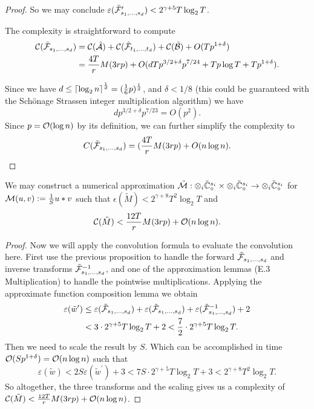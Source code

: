 \begin{proof}
    So we may conclude $\varepsilon(\tilde{\mathcal F}_{s_1, \ldots, s_d}^\prime) < 2^{\gamma + 5}T\log_2 T$.

    The complexity is straightforward to compute
    \begin{align*}
        \mathcal C(\tilde{\mathcal F}_{s_1, \ldots, s_d}) &= \mathcal C(\tilde{\mathcal A}) + \mathcal C(\tilde{\mathcal F}_{t_1, \ldots, t_d}) + \mathcal C(\tilde{\mathcal B}) + O(Tp^{1 + \delta})\\
                                                &= \frac{4T}{r}M(3rp) + O(dTp^{3/2 + \delta}p^{7/24} + Tp\log T + Tp^{1 + \delta}).
    \end{align*}

    Since we have $d  \le \left \lceil \log_2 n \right \rceil^{\frac{1}{d}} = (\frac{1}{6} p)^{\frac{1}{d}}$, and $\delta < 1/8$ (this could be guaranteed with the Sch\"{o}nage Strassen integer multiplication algorithm) we have
    \[
        dp^{3/2 + \delta}p^{7/23} = O(p^2).
    \]
    Since $p = \mathcal O(\log n)$ by its definition, we can further simplify the complexity to
    \[
        C(\tilde{\mathcal F}_{s_1, \ldots, s_d}) = (\frac{4T}{r}M(3rp) + O(n \log n).
    \]
\end{proof}

\begin{proposition}
    We may construct a numerical approximation $\tilde{\mathcal M}: \otimes_i \tilde{{\mathbb C}}_\circ^{s_i} \times \otimes_i \tilde{{\mathbb C}}_\circ^{s_i} \to \otimes_i \tilde{{\mathbb C}}_\circ^{s_i}$ for $\mathcal M(u, v) := \frac{1}{S}u \ast v$ such that $\epsilon(\tilde{M}) < 2^{\gamma + 8}T^2 \log_2T$ and
    \[
        \mathcal C(\tilde{M}) < \frac{12T}{r} M(3rp) + \mathcal O(n \log n).
    \]
\end{proposition}

\begin{proof}
    Now we will apply the convolution formula to evaluate the convolution here. First use the previous proposition to handle the forward $\tilde{\mathcal F}_{s_1, \ldots, s_d}$ and inverse transforms $\tilde{\mathcal F}_{s_1, \ldots, s_d}^{-1}$, and one of the approximation lemmas (E.3 Multiplication) to handle the pointwise multiplications. Applying the approximate function composition lemma we obtain
    \begin{align*}
        \varepsilon(\tilde{w}^\prime) &\leq \varepsilon(\tilde{\mathcal F}_{s_1, \ldots, s_d}) + \varepsilon(\tilde{\mathcal F}_{s_1, \ldots, s_d}) + \varepsilon(\tilde{\mathcal F}^{-1}_{s_1, \ldots, s_d}) + 2\\
                                      &< 3 \cdot 2^{\gamma + 5}T\log_2 T + 2 < \frac{7}{2} \cdot 2^{\gamma + 5}T \log_2 T.
    \end{align*}
    Then we need to scale the result by $S$. Which can be accomplished in time $\mathcal O(Sp^{1 + \delta}) = \mathcal O(n \log n)$ such that
    \[
        \varepsilon(\tilde{w}) < 2S\varepsilon(\tilde{w}^\prime) + 3 < 7S \cdot 2^{\gamma + 5} T \log_2 T + 3 < 2^{\gamma + 8}T^2 \log_2 T.
    \]
    So altogether, the three transforms and the scaling gives us a complexity of $\mathcal C(\tilde{M}) < \frac{12T}{r} M(3rp) + \mathcal O(n \log n)$.
\end{proof}


